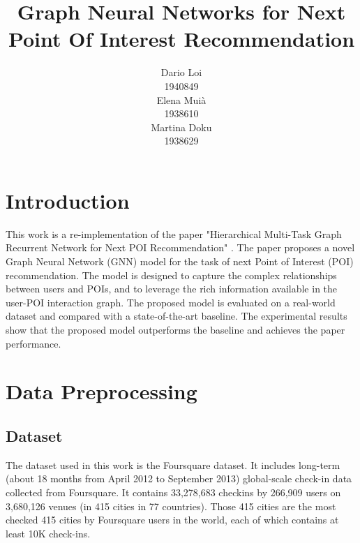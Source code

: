 \documentclass[twocolumn,twoside]{article}
\title{Graph Neural Networks for Next Point Of Interest Recommendation
}
\author{
  Dario Loi\\
  1940849\\
   \And
  Elena Muià \\
  1938610 \\
  \And
  Martina Doku \\
  1938629\\
}
\begin{document}


\section{Introduction}
This work is a re-implementation of the paper "Hierarchical Multi-Task Graph Recurrent Network for Next POI Recommendation" \cite{main_paper}.
The paper proposes a novel Graph Neural Network (GNN) model for the task of
next Point of Interest (POI) recommendation. The model is designed to
capture the complex relationships between users and POIs, and to
leverage the rich information available in the user-POI interaction
graph. The proposed model is evaluated on a real-world dataset and
compared with a state-of-the-art baseline. The experimental results
show that the proposed model outperforms the baseline and
achieves the paper performance.


\section{Data Preprocessing}
\subsection{Dataset}
The dataset used in this work is the Foursquare dataset\cite{foursquare}. It includes
long-term (about 18 months from April 2012 to September 2013) global-scale
check-in data collected from Foursquare. It contains 33,278,683 checkins by
266,909 users on 3,680,126 venues (in 415 cities in 77 countries).
Those 415 cities are the most checked 415 cities by Foursquare users in the world,
each of which contains at least 10K check-ins.
\end{document}
